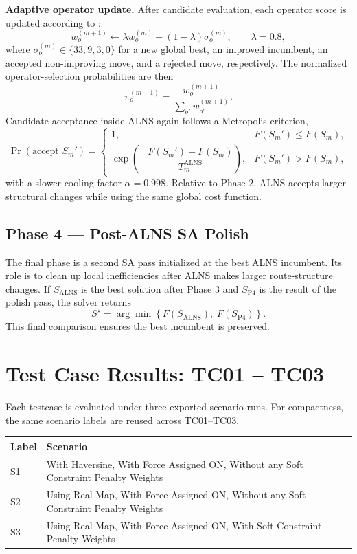 \documentclass[11pt,a4paper]{article}
\begin{document}
\noindent\textbf{Adaptive operator update.} After candidate evaluation, each operator score is updated according to \cite{ropke2006}:
\[
w_o^{(m+1)} \leftarrow \lambda w_o^{(m)} + (1-\lambda)\sigma_o^{(m)},
\qquad \lambda=0.8,
\]
where $\sigma_o^{(m)} \in \{33,9,3,0\}$ for a new global best, an improved incumbent, an accepted non-improving move, and a rejected move, respectively. The normalized operator-selection probabilities are then
\[
\pi_o^{(m+1)}=\frac{w_o^{(m+1)}}{\sum_{o'} w_{o'}^{(m+1)}}.
\]
Candidate acceptance inside ALNS again follows a Metropolis criterion,
\[
\Pr(\text{accept }S_m')=
\begin{cases}
1, & F(S_m')\le F(S_m),\\
\exp\!\left(-\dfrac{F(S_m')-F(S_m)}{T_m^{\mathrm{ALNS}}}\right), & F(S_m')>F(S_m),
\end{cases}
\]
with a slower cooling factor $\alpha=0.998$. Relative to Phase 2, ALNS accepts larger structural changes while using the same global cost function.

\subsection{Phase 4 --- Post-ALNS SA Polish}

The final phase is a second SA pass initialized at the best ALNS incumbent. Its role is to clean up local inefficiencies after ALNS makes larger route-structure changes. If $S_{\mathrm{ALNS}}$ is the best solution after Phase 3 and $S_{\mathrm{P4}}$ is the result of the polish pass, the solver returns
\[
S^\star = \arg\min \left\{F(S_{\mathrm{ALNS}}),\; F(S_{\mathrm{P4}})\right\}.
\]
This final comparison ensures the best incumbent is preserved.

\section{Test Case Results: TC01 -- TC03}

\noindent Each testcase is evaluated under three exported scenario runs. For compactness, the same scenario labels are reused across TC01--TC03.

\begin{center}\small
\begin{tabularx}{0.96\textwidth}{@{}p{}X@{}}
\toprule
\rowcolor{tblhead}\textbf{Label} & \textbf{Scenario} \\
\midrule
\rowcolor{rowalt}S1 & With Haversine, With Force Assigned ON, Without any Soft Constraint Penalty Weights \\
S2 & Using Real Map, With Force Assigned ON, Without any Soft Constraint Penalty Weights \\
\rowcolor{rowalt}S3 & Using Real Map, With Force Assigned ON, With Soft Constraint Penalty Weights \\
\bottomrule
\end{tabularx}
\end{center}
\end{document}
